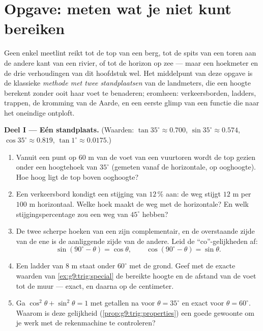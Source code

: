 \section{Opgave: meten wat je niet kunt bereiken}

\begin{problem}
\label{pb:g9:trig:1}
Geen enkel meetlint reikt tot de top van een berg, tot de spits van een toren aan
de andere kant van een rivier, of tot de horizon op zee --- maar een hoekmeter en
de drie verhoudingen van dit hoofdstuk wel. Het middelpunt van deze opgave is de
klassieke \emph{methode met twee standplaatsen} van de landmeters, die een hoogte
berekent zonder ooit haar voet te benaderen; eromheen: verkeersborden, ladders,
trappen, de kromming van de Aarde, en een eerste glimp van een functie die naar het
oneindige ontploft.

\medskip
\noindent\textbf{Deel I --- Eén standplaats.}
(Waarden: $\tan 35^\circ \approx 0.700$, $\sin 35^\circ \approx 0.574$,
$\cos 35^\circ \approx 0.819$, $\tan 1^\circ \approx 0.0175$.)
\begin{enumerate}
  \item Vanuit een punt op $60$ m van de voet van een vuurtoren wordt de top gezien
        onder een hoogtehoek van $35^\circ$ (gemeten vanaf de horizontale, op
        ooghoogte). Hoe hoog ligt de top boven ooghoogte?
  \item Een verkeersbord kondigt een stijging van $12\,\%$ aan: de weg stijgt
        $12$ m per $100$ m horizontaal. Welke hoek maakt de weg met de horizontale?
        En welk stijgingspercentage zou een weg van $45^\circ$ hebben?
  \item De twee scherpe hoeken van een  zijn complementair, en
        de overstaande zijde van de ene is de aanliggende zijde van de andere. Leid
        de ``co''-gelijkheden af:
        \[
        \sin(90^\circ - \theta) = \cos\theta,
        \qquad
        \cos(90^\circ - \theta) = \sin\theta .
        \]
  \item Een ladder van $8$ m staat onder $60^\circ$ met de grond. Geef met de
        exacte waarden van \cref{ex:g9:trig:special} de bereikte hoogte en de
        afstand van de voet tot de muur --- exact, en daarna op de centimeter.
  \item Ga $\cos^2\theta + \sin^2\theta = 1$ met getallen na voor
        $\theta = 35^\circ$ en exact voor $\theta = 60^\circ$. Waarom is deze
        gelijkheid (\cref{prop:g9:trig:properties}) een goede gewoonte om je werk
        met de rekenmachine te controleren?
\end{enumerate}


\end{problem}
